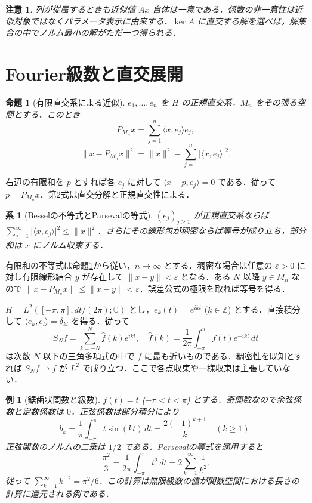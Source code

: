 \documentclass[a5paper,10pt,onecolumn]{jsarticle}
\makeatletter
\theoremstyle{mathnotetheorem}
\newtheorem{proposition}[theorem]{命題}
\newtheorem{corollary}[theorem]{系}
\newtheorem{example}[theorem]{例}
\newtheorem{remark}[theorem]{注意}
\renewcommand{\proofname}{証明}
\renewenvironment{proof}[1][\proofname]{%
  \par\pushQED{\qed}\normalfont\topsep4\p@\@plus2\p@\relax
  \trivlist\item[\hskip\labelsep\bfseries #1]\ignorespaces
}{\popQED\endtrivlist\@endpefalse}
\newcommand{\norm}[1]{\lVert #1\rVert}
\newcommand{\abs}[1]{\lvert #1\rvert}
\makeatother
\begin{document}
\begin{remark}
列が従属するときも近似値 $Ax$ 自体は一意である．係数の非一意性は近似対象ではなくパラメータ表示に由来する．$\ker A$ に直交する解を選べば，解集合の中でノルム最小の解がただ一つ得られる．
\end{remark}

\section{Fourier級数と直交展開}
\begin{proposition}[有限直交系による近似]\label{prop:finite}
$e_1,\ldots,e_n$ を $H$ の正規直交系，$M_n$ をその張る空間とする．このとき
\[
 P_{M_n}x=\sum_{j=1}^n\langle x,e_j\rangle e_j,
\]
\[
 \norm{x-P_{M_n}x}^2=\norm x^2-\sum_{j=1}^n\abs{\langle x,e_j\rangle}^2.
\]
\end{proposition}
\begin{proof}
右辺の有限和を $p$ とすれば各 $e_j$ に対して $\langle x-p,e_j\rangle=0$ である．従って $p=P_{M_n}x$．第2式は直交分解と正規直交性による．
\end{proof}
\begin{corollary}[Besselの不等式とParsevalの等式]
$(e_j)_{j\ge1}$ が正規直交系ならば
$\sum_{j=1}^\infty\abs{\langle x,e_j\rangle}^2\le\norm x^2$．さらにその線形包が稠密ならば等号が成り立ち，部分和は $x$ にノルム収束する．
\end{corollary}
\begin{proof}
有限和の不等式は命題\ref{prop:finite}から従い，$n\to\infty$ とする．稠密な場合は任意の $\varepsilon>0$ に対し有限線形結合 $y$ が存在して $\norm{x-y}<\varepsilon$ となる．ある $N$ 以降 $y\in M_n$ なので $\norm{x-P_{M_n}x}\le\norm{x-y}<\varepsilon$．誤差公式の極限を取れば等号を得る．
\end{proof}

$H=L^2([ -\pi,\pi],dt/(2\pi);\mathbb C)$ とし，$e_k(t)=e^{ikt}$ ($k\in\mathbb Z$) とする．直接積分して $\langle e_k,e_l\rangle=\delta_{kl}$ を得る．従って
\[
 S_N f=\sum_{k=-N}^N\widehat f(k)e^{ikt},\quad
 \widehat f(k)=\frac1{2\pi}\int_{-\pi}^\pi f(t)e^{-ikt}\,dt
\]
は次数 $N$ 以下の三角多項式の中で $f$ に最も近いものである．稠密性を既知とすれば $S_N f\to f$ が $L^2$ で成り立つ．ここで各点収束や一様収束は主張していない．
\begin{example}[鋸歯状関数と級数]
$f(t)=t$ ($-\pi<t<\pi$) とする．奇関数なので余弦係数と定数係数は $0$．正弦係数は部分積分により
\[
 b_k=\frac1\pi\int_{-\pi}^\pi t\sin(kt)\,dt
 =\frac{2(-1)^{k+1}}k\quad(k\ge1).
\]
正弦関数のノルムの二乗は $1/2$ である．Parsevalの等式を適用すると
\[
 \frac{\pi^2}{3}=\frac1{2\pi}\int_{-\pi}^\pi t^2\,dt
 =2\sum_{k=1}^\infty\frac1{k^2}.
\]
従って $\sum_{k=1}^\infty k^{-2}=\pi^2/6$．この計算は無限級数の値が関数空間における長さの計算に還元される例である．
\end{example}
\end{document}
